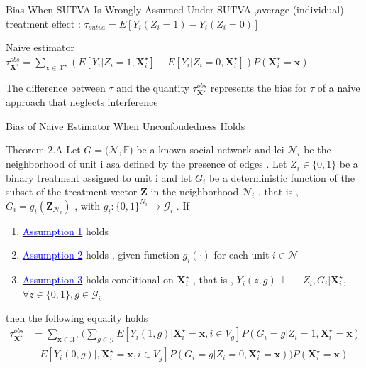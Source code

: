 \documentclass[notes,11pt, aspectratio=169]{beamer}
\begin{document}
\begin{frame}{Bias When SUTVA Is Wrongly Assumed}
Under SUTVA ,average (individual) treatment effect : $\tau_{sutva}=E[Y_i(Z_i=1)-Y_i(Z_i=0)]$
\vspace{1em}
\begin{block}{Naive estimator}
\centering
$\tau_{\mathbf{X}^\star}^{obs}=\sum_{\mathbf{x} \in \mathcal{X}^\star}(E[Y_i|Z_i=1,\mathbf{X}_{i}^\star]-E[Y_i|Z_i=0,\mathbf{X}_{i}^\star])P(\mathbf{X}_{i}^\star=\mathbf{x})$
\end{block}
%
\vspace{1em}
The difference between $\tau$  and the quantity $\tau_{\mathbf{X}^\star}^{obs}$ represents the bias for $\tau$ of a naive approach that neglects interference
\end{frame}

\begin{frame}{Bias of Naive Estimator When Unconfoudedness Holds}
\begin{block}{Theorem 2.A} \label{theorem 2.A}
Let $G=(\mathcal{N},\mathbb{E}$) be a known social network and lei $\mathcal{N}_i$ be the neighborhood of unit i asa defined by the presence of edges . Let $Z_i \in \{0,1\}$ be a binary treatment assigned to unit i and let $G_i$ be a deterministic function of the subset of the treatment vector $\mathbf{Z}$ in the neighborhood $\mathcal{N}_i$ , that is , $ G_i = g_i(\mathbf{Z}_{\mathcal{N}_i})$ , with $g_i : \{0,1\}^{N_i} \rightarrow \mathcal{G}_i$ . If
\begin{enumerate}
    \item \hyperlink{assump1}{\textcolor{blue}{Assumption 1}} holds
    \item \hyperlink{assump2}{\textcolor{blue}{Assumption 2}} holds , given function $g_i(\cdot)$ for each unit $i \in \mathcal{N}$
    \item \hyperlink{assump3}{\textcolor{blue}{Assumption 3}} holds conditional on $\mathbf{X}_{i}^\star$ , that is , $Y_i(z,g) \perp\!\!\!\perp Z_i,G_i|\mathbf{X}_{i}^\star$, $\forall z \in \{0,1\} , g \in \mathcal{G}_i$
\end{enumerate}
then the following equality holds
\begin{align*}
\tau_{\mathbf{X}^\star}^{obs}&=\sum_{\mathbf{x} \in \mathcal{X}^\star} \Big( \sum_{g \in \mathcal{G}}E[Y_i(1,g)|\mathbf{X}_{i}^\star = \mathbf{x}, i \in V_g]P(G_i=g | Z_i=1 , \mathbf{X}_{i}^\star=\mathbf{x}) 
\\  &  -E[Y_i(0,g)|,\mathbf{X}_{i}^\star =\mathbf{x} , i \in V_g]P(G_i=g | Z_i=0,\mathbf{X}_{i}^\star=\mathbf{x})  \Big)  P(\mathbf{X}_{i}^\star=\mathbf{x}) %
\end{align*}
\end{block}
\end{frame}
\end{document}
